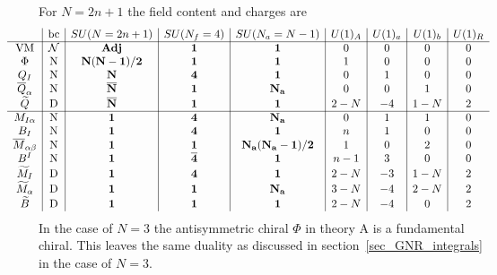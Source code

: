 \documentclass[12pt]{article}
\numberwithin{equation}{section}
\begin{document}
For $N=2n+1$ the field content and charges are 
\begin{align}
\hspace*{-1cm}
\label{alt_SUN_odd_AS_charges}
\begin{array}{c|c|c|c|c|c|c|c|c}
& \textrm{bc} & SU(N = 2n+1) & SU(N_f = 4) & SU(N_a = N - 1) & U(1)_A & U(1)_a & U(1)_b & U(1)_R \\ \hline
\textrm{VM} & \mathcal{N} & {\bf Adj} & {\bf 1} & {\bf 1} & 0 & 0 & 0 & 0 \\
\Phi & \textrm{N} & {\bf N(N-1)/2} & {\bf 1} & {\bf 1} & 1 & 0 & 0 & 0 \\
Q_I & \textrm{N} & {\bf N} & {\bf 4} & {\bf 1} & 0 & 1 & 0 & 0 \\
\overline{Q}_{\alpha} & \textrm{N} & {\bf \overline{N}} & {\bf 1} & {\bf N_a} & 0 & 0 & 1 & 0 \\
\widetilde{Q} & \textrm{D} & {\bf \overline{N}} & {\bf 1} & {\bf 1} & 2 - N & -4 & 1-N & 2 \\
 \hline
M_{I \alpha} & \textrm{N} & {\bf 1} & {\bf 4} & {\bf N_a} & 0 & 1 & 1 & 0 \\
B_I & \textrm{N} & {\bf 1} & {\bf 4} & {\bf 1} & n & 1 & 0 & 0 \\
\overline{M}_{\alpha \beta} & \textrm{N} & {\bf 1} & {\bf 1} & {\bf N_a(N_a-1)/2} & 1 & 0 & 2 & 0 \\
B^I & \textrm{N} & {\bf 1} & {\bf \overline{4}} & {\bf 1} & n-1 & 3 & 0 & 0 \\
\widetilde{M}_I & \textrm{D} & {\bf 1} & {\bf 4} & {\bf 1} & 2-N & -3 & 1-N & 2 \\
\widetilde{M}_{\alpha} & \textrm{D} & {\bf 1} & {\bf 1} & {\bf N_a} & 3-N & -4 & 2-N & 2 \\
\widetilde{B} & \textrm{D} & {\bf 1} & {\bf 1} & {\bf 1} & 2-N & -4 & 0 & 2 \\
\end{array}
\end{align}
In the case of $N = 3$ the antisymmetric chiral $\Phi$ in theory A is a fundamental chiral. 
This leaves the same duality as discussed in section~\ref{sec_GNR_integrals} in the case of $N = 3$.
\end{document}
